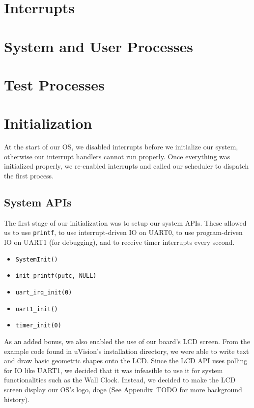 \documentclass[se]{uw-wkrpt}
\begin{document}
\section{Interrupts}\label{sec:interupt}

\section{System and User Processes}\label{sec:proc}

\section{Test Processes}\label{sec:testproc}

\section{Initialization}\label{sec:init}

At the start of our OS, we disabled interrupts before we initialize our system, otherwise our interrupt handlers cannot run properly. Once everything was initialized properly, we re-enabled interrupts and called our scheduler to dispatch the first process.

\subsection{System APIs}
The first stage of our initialization was to setup our system APIs. These allowed us to use \texttt{printf}, to use interrupt-driven IO on UART0, to use program-driven IO on UART1 (for debugging), and to receive timer interrupts every second.

\begin{itemize}
	\item \texttt{SystemInit()}
	\item \texttt{init\_printf(putc, NULL)}	
	\item \texttt{uart\_irq\_init(0)}
	\item \texttt{uart1\_init()}
	\item \texttt{timer\_init(0)}
\end{itemize}

As an added bonus, we also enabled the use of our board's LCD screen. From the example code found in uVision's installation directory, we were able to write text and draw basic geometric shapes onto the LCD. Since the LCD API uses polling for IO like UART1, we decided that it was infeasible to use it for system functionalities such as the Wall Clock. Instead, we decided to make the LCD screen display our OS's logo, doge (See Appendix~TODO for more background history).
\end{document}
